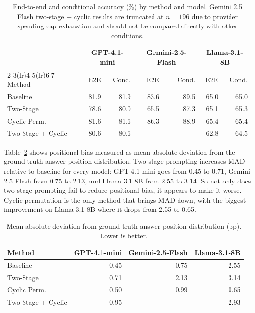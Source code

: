 \documentclass{article}
\begin{document}
\begin{table}[ht]
\centering
\caption{End-to-end and conditional accuracy (\%) by method and model. Gemini 2.5 Flash two-stage + cyclic results are truncated at $n=196$ due to provider spending cap exhaustion and should not be compared directly with other conditions.}
\label{tab:accuracy}
\begin{tabular}{lrrrrrr}
\toprule
  & \multicolumn{2}{c}{GPT-4.1-mini} & \multicolumn{2}{c}{Gemini-2.5-Flash} & \multicolumn{2}{c}{Llama-3.1-8B} \\
\cmidrule(lr){2-3}\cmidrule(lr){4-5}\cmidrule(lr){6-7}
Method & E2E & Cond. & E2E & Cond. & E2E & Cond. \\
\midrule
Baseline & 81.9 & 81.9 & 83.6 & 89.5 & 65.0 & 65.0 \\
Two-Stage & 78.6 & 80.0 & 65.5 & 87.3 & 65.1 & 65.3 \\
Cyclic Perm. & 81.6 & 81.6 & 86.3 & 88.9 & 65.4 & 65.4 \\
Two-Stage + Cyclic & 80.6 & 80.6 & --- & --- & 62.8 & 64.5 \\
\bottomrule
\end{tabular}
\end{table}

Table~\ref{tab:bias} shows positional bias measured as mean absolute deviation from the ground-truth answer-position distribution. Two-stage prompting increases MAD relative to baseline for every model: GPT-4.1 mini goes from 0.45 to 0.71, Gemini 2.5 Flash from 0.75 to 2.13, and Llama 3.1 8B from 2.55 to 3.14. So not only does two-stage prompting fail to reduce positional bias, it appears to make it worse. Cyclic permutation is the only method that brings MAD down, with the biggest improvement on Llama 3.1 8B where it drops from 2.55 to 0.65.

\begin{table}[ht]
\centering
\caption{Mean absolute deviation from ground-truth answer-position distribution (pp). Lower is better.}
\label{tab:bias}
\begin{tabular}{lrrr}
\toprule
Method & GPT-4.1-mini & Gemini-2.5-Flash & Llama-3.1-8B \\
\midrule
Baseline & 0.45 & 0.75 & 2.55 \\
Two-Stage & 0.71 & 2.13 & 3.14 \\
Cyclic Perm. & 0.50 & 0.99 & 0.65 \\
Two-Stage + Cyclic & 0.95 & --- & 2.93 \\
\bottomrule
\end{tabular}
\end{table}
\end{document}
